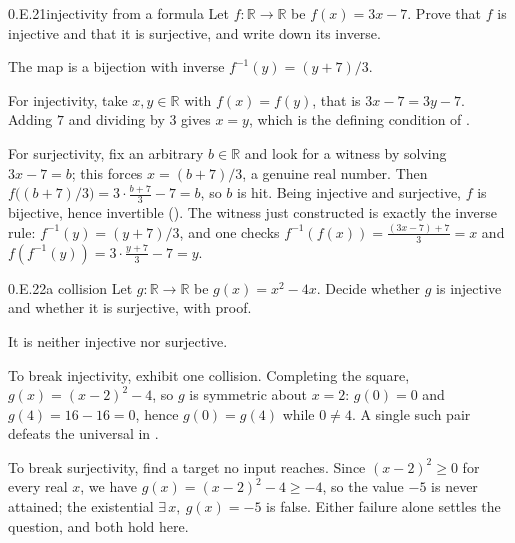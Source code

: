 \documentclass[main.tex]{subfiles}
\begin{document}
\begin{Exercise}{0.E.21}{injectivity from a formula}
Let $f\colon\mathbb R\to\mathbb R$ be $f(x)=3x-7$. Prove that $f$ is injective and that it is
surjective, and write down its inverse.
\end{Exercise}
\begin{Solution}
The map is a bijection with inverse $f^{-1}(y)=(y+7)/3$.

For injectivity, take $x,y\in\mathbb R$ with $f(x)=f(y)$, that is $3x-7=3y-7$. Adding $7$ and dividing
by $3$ gives $x=y$, which is the defining condition of .

For surjectivity, fix an arbitrary $b\in\mathbb R$ and look for a witness by solving $3x-7=b$; this
forces $x=(b+7)/3$, a genuine real number. Then $f\bigl((b+7)/3\bigr)=3\cdot\frac{b+7}{3}-7=b$, so $b$
is hit. Being injective and surjective, $f$ is bijective, hence invertible (). The witness
just constructed is exactly the inverse rule: $f^{-1}(y)=(y+7)/3$, and one checks
$f^{-1}(f(x))=\frac{(3x-7)+7}{3}=x$ and $f(f^{-1}(y))=3\cdot\frac{y+7}{3}-7=y$.
\end{Solution}

\begin{Exercise}{0.E.22}{a collision}
Let $g\colon\mathbb R\to\mathbb R$ be $g(x)=x^2-4x$. Decide whether $g$ is injective and whether it is
surjective, with proof.
\end{Exercise}
\begin{Solution}
It is neither injective nor surjective.

To break injectivity, exhibit one collision. Completing the square, $g(x)=(x-2)^2-4$, so $g$ is
symmetric about $x=2$: $g(0)=0$ and $g(4)=16-16=0$, hence $g(0)=g(4)$ while $0\neq 4$. A single such
pair defeats the universal in .

To break surjectivity, find a target no input reaches. Since $(x-2)^2\ge 0$ for every real $x$, we have
$g(x)=(x-2)^2-4\ge -4$, so the value $-5$ is never attained; the existential
$\exists\,x,\ g(x)=-5$ is false. Either failure alone settles the question, and both hold here.
\end{Solution}
\end{document}

